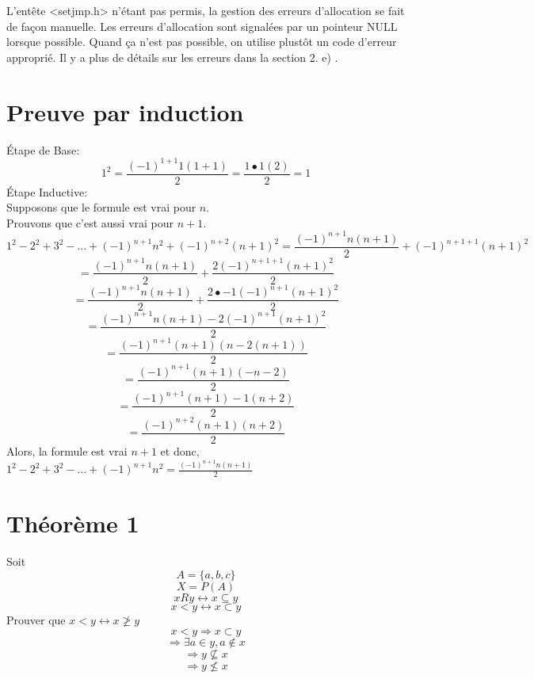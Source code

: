 \documentclass[a4paper,12pt]{article}
\begin{document}
	L'entête <setjmp.h> n'étant pas permis, la gestion des erreurs d'allocation se fait de
	façon manuelle. Les erreurs d'allocation sont signalées par un pointeur NULL lorsque
	possible. Quand ça n'est pas possible, on utilise plustôt un code d'erreur approprié.
	Il y a plus de détails sur les erreurs dans la section 2. e) .

\section{Preuve par induction}
Étape de Base:\\
	\[1^2 = \frac{(-1)^{1+1}1(1+1)}{2} = \frac{1\bullet 1 (2)}{2} = 1\]
Étape Inductive:\\
	Supposons que le formule est vrai pour $n$.\\
	Prouvons que c'est aussi vrai pour $n+1$.
	\[1^2 - 2^2 + 3^2 - ... + (-1)^{n+1}n^2 + (-1)^{n+2}(n+1)^2 = \frac{(-1)^{n+1}n(n+1)}{2}  + (-1)^{n+1+1}(n+1)^2 \]
	\[= \frac{(-1)^{n+1}n(n+1)}{2}  + \frac{2(-1)^{n+1+1}(n+1)^2}{2}\]
	\[= \frac{(-1)^{n+1}n(n+1)}{2}  + \frac{2\bullet-1(-1)^{n+1}(n+1)^2}{2}\]
	\[= \frac{(-1)^{n+1}n(n+1)  -2(-1)^{n+1}(n+1)^2}{2}\]
	\[= \frac{(-1)^{n+1}(n+1)(n  -2(n+1))}{2}\]
	\[= \frac{(-1)^{n+1}(n+1)(-n-2)}{2}\]
	\[= \frac{(-1)^{n+1}(n+1) -1 (n+2)}{2}\]
	\[= \frac{(-1)^{n+2}(n+1)(n+2)}{2}\]
	Alors, la formule est vrai $n+1$ et donc, $1^2 - 2^2 + 3^2 - ... + (-1)^{n+1}n^2 = \frac{(-1)^{n+1}n(n+1)}{2}$
\section{Théorème 1}
	Soit
	\[A = \{a, b, c\}\]
	\[X = P(A)\]
	\[x R y \leftrightarrow x \subseteq y \]
	\[ x < y \leftrightarrow x \subset y  \]
	Prouver que $ x < y \leftrightarrow x \ngeq y$\\
	\linebreak
	\[ x < y \Longrightarrow x \subset y\]
	\[ \Longrightarrow \exists a \in y , a \notin x \]
	\[ \Longrightarrow y \not \subseteq x \]
	\[ \Longrightarrow y \not\leq x \]
\newpage
\end{document}
